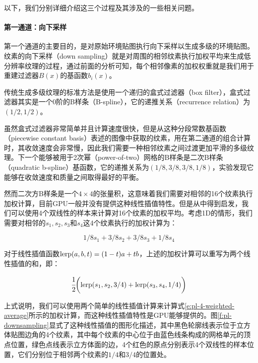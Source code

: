 以下，我们分别详细介绍这三个过程及其涉及的一些相关问题。



\paragraph{第一通道：向下采样}
第一个通道的主要目的，是对原始环境贴图执行向下采样以生成多级的环境贴图。纹素的向下采样（down sampling）就是对周围的相邻纹素执行加权平均来生成低分辨率纹理的过程，通过前面的分析可知，每个相邻像素的加权权重就是我们用于重建过滤器$B(x)$的基函数$b_i(x)$。

传统生成多级纹理的标准方法是使用一个递归的盒式过滤器（box filter），盒式过滤器其实是一个0阶的B样条（B-spline），它的递推关系（recurrence relation）为$(1/2,1/2)$\cite{a:Apracticalguidetosplines;rev.ed}。

虽然盒式过滤器非常简单并且计算速度很快，但是从这种分段常数基函数（piecewise constant basis）表述的图像中获取的纹素，用在第二通道的组合计算时，其收敛速度会非常慢，因此我们需要一种相邻纹素之间过渡更加平滑的多级纹理。下一个能够被用于2次幂（power-of-two）网格的B样条是二次B样条（quadratic b-spline）基函数，它的递推关系为$(1/8,3/8,3/8,1/8)$，实验发现它能够在收敛速度和质量之间取得最好的平衡。

然而二次方B样条是一个$4\times 4$的张量积，这意味着我们需要对相邻的16个纹素执行加权计算，目前GPU一般并没有提供这种线性插值特性。但是从\cite{a:Fastthird-ordertexturefiltering}中得到启发，我们可以使用4个双线性的样本来计算对16个纹素的加权平均。考虑1D的情形，我们需要对相邻的$s_1,s_2,s_3$和$s_4$这4个纹素执行的加权计算为：

\begin{equation}\label{e:pl-4-weighted-average}
	1/8s_1+3/8s_2+3/8s_3+1/8s_4
\end{equation}

\noindent 对于线性插值函数${\rm lerp}(a,b,t)=(1-t)a+tb$，上述的加权计算可以重写为两个线性插值的和，即：

\begin{equation}
	\cfrac{1}{2}\bigg({\rm lerp}(s_1,s_2,3/4)+{\rm lerp}(s_3,s_4,1/4)\bigg)
\end{equation}

上式说明，我们可以使用两个简单的线性插值计算来计算式\ref{e:pl-4-weighted-average}所示的加权计算，而这种线性插值特性是GPU能够提供的。图\ref{f:pl-downsampling}显式了这种线性插值的图形化描述，其中黑色轮廓线表示位于立方体贴图边角的4个纹素，其中每个纹素的中心位于由蓝色线条构成的网格单元的顶点位置，绿色点线表示立方体面的边，4个红色的原点分别表示4个双线性的样本位置，它们分别位于相邻两个纹素的$1/4$和$3/4$的位置处。

